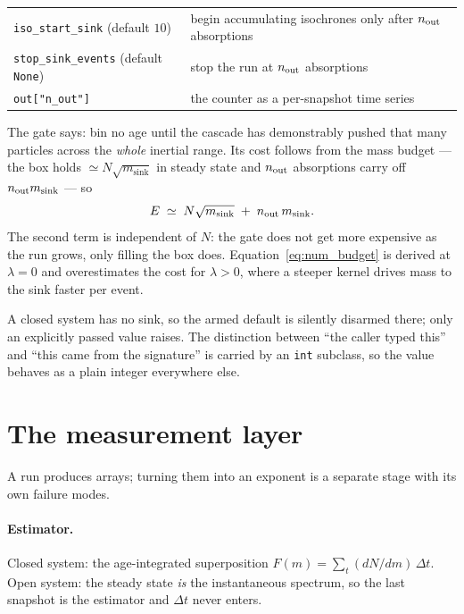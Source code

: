 \documentclass[a4paper,12pt]{article}
\newcommand{\msink}{m_{\mathrm{sink}}}
\newcommand{\code}[1]{\texttt{#1}}
\begin{document}
\begin{center}
\small
\begin{tabular}{@{}l p{8.2cm}@{}}
\toprule
\code{iso\_start\_sink} (default $10$) &
  begin accumulating isochrones only after $n_{\rm out}$ absorptions \\
\code{stop\_sink\_events} (default \code{None}) &
  stop the run at $n_{\rm out}$ absorptions \\
\code{out["n\_out"]} &
  the counter as a per-snapshot time series \\
\bottomrule
\end{tabular}
\end{center}

The gate says: bin no age until the cascade has demonstrably pushed that
many particles across the \emph{whole} inertial range. Its cost follows from
the mass budget --- the box holds $\simeq N\sqrt{\msink}$ in steady state and
$n_{\rm out}$ absorptions carry off $n_{\rm out}\msink$ --- so
\begin{equation}
  E \;\simeq\; N\sqrt{\msink} \;+\; n_{\rm out}\,\msink .
  \label{eq:num_budget}
\end{equation}
The second term is independent of $N$: the gate does not get more expensive
as the run grows, only filling the box does. Equation~\eqref{eq:num_budget}
is derived at $\lambda = 0$ and overestimates the cost for $\lambda > 0$,
where a steeper kernel drives mass to the sink faster per event.

A closed system has no sink, so the armed default is silently disarmed
there; only an explicitly passed value raises. The distinction between ``the
caller typed this'' and ``this came from the signature'' is carried by an
\code{int} subclass, so the value behaves as a plain integer everywhere else.

\section{The measurement layer}
\label{sec:num_measure}

A run produces arrays; turning them into an exponent is a separate stage
with its own failure modes.

\paragraph{Estimator.} Closed system: the age-integrated superposition
$F(m) = \sum_t (dN/dm)\,\Delta t$. Open system: the steady state \emph{is}
the instantaneous spectrum, so the last snapshot is the estimator and
$\Delta t$ never enters.
\end{document}
